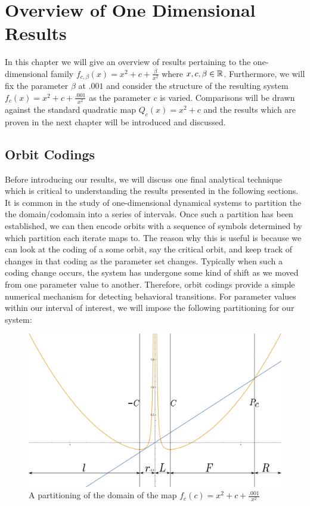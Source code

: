 \chapter{Overview of One Dimensional Results}

	In this chapter we will give an overview of results pertaining to the one-dimensional family $f_{c, \beta} (x) = x^2 + c + \frac{\beta}{x^2}$ where $x, c, \beta \in \mathbb{R}$. Furthermore, we will fix the parameter $\beta$ at $.001$ and consider the structure of the resulting system $f_{c} (x) = x^2 + c + \frac{.001}{x^2}$ as the parameter $c$ is varied. Comparisons will be drawn against the standard quadratic map $Q_c (x) = x^2+c$ and the results which are proven in the next chapter will be introduced and discussed.


	

	

	\section{Orbit Codings}

	Before introducing our results, we will discuss one final analytical technique which is critical to understanding the results presented in the following sections. It is common in the study of one-dimensional dynamical systems to partition the the domain/codomain into a series of intervals. Once such a partition has been established, we can then encode orbits with a sequence of symbols determined by which partition each iterate maps to. The reason why this is useful is because we can look at the coding of a some orbit, say the critical orbit, and keep track of changes in that coding as the parameter set changes. Typically when such a coding change occurs, the system has undergone some kind of shift as we moved from one parameter value to another. Therefore, orbit codings provide a simple numerical mechanism for detecting behavioral transitions. For parameter values within our interval of interest, we will impose the following partitioning for our system:

	\begin{figure}
		\centering
		\includegraphics[width=.75\textwidth]{./img/codings.pdf}
		\caption{A partitioning of the domain of the map $f_c (c) = x^2 + c + \frac{.001}{x^2}$}
		\label{coding}
	\end{figure}

